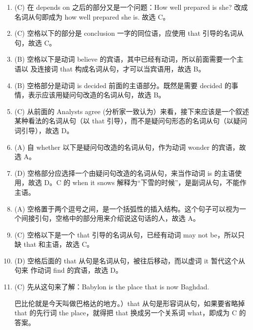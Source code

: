 \begin{enumerate}
\item  (C) 在 depends on 之后的部分又是一个问题：How well prepared is she? 改成名词从句即成为 how well prepared she is. 故选 C。

\item (C) 空格以下的部分是 conclusion 一字的同位语，应使用 that 引导的名词从句，故选 C。

\item (B) 空格以下是动词 believe 的宾语，其中已经有动词，所以前面需要一个主语以
  及连接词 that 构成名词从句，才可以当宾语用，故选 B。
\item (B) 空格部分是动词 is decided 前面的主语部分。既然是需要 decided 的事情，表示应该用疑问句改造的名词从句，故选 B。
\item (C) 从前面的 Analysts agree (分析家一致认为）来看，接下来应该是一个叙述某种看法的名词从句（以 that 引导），而不是疑问句形态的名词从句（以疑问词引导），故选 D。

\item  (A) 自 whether 以下是疑问句改造的名词从句，作为动词 wonder 的宾语，故选 A。

\item (D) 空格部分应选择一个由疑问句改造的名词从句，来当作动词 is 的主语使用，故选 D。C 的 when it snows 解释为“下雪的时候”，是副词从句，不能作主语。

\item (A) 空格置于两个逗号之间，是一个括弧性的插入结构。这个句子可以视为一个间接引句，空格中的部分用来介绍说这句话的人，故选 A。

\item (C) 空格以下是一个 that 引导的名词从句，已经有动词 may not be，所以只缺 that 和主语，故选 C。

\item (D) 空格后面的 that 从句是名词从句，被往后移动，而以虚词 it 暂代这个从句来
  作动词 find 的宾语，故选 D。

\item (C) 先从这句来了解：Babylon is the place that is now Baghdad.

  巴比伦就是今天叫做巴格达的地方。）that 从句是形容词从句，如果要省略掉 that
  的先行词 the place，就得把 that 换成另一个关系词 what，即成为 C 的答案。

\end{enumerate}



